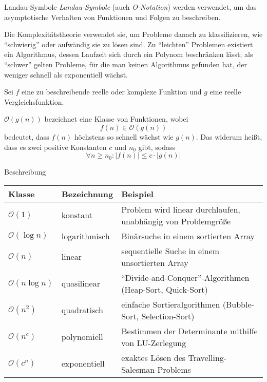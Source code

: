 \begin{defi}{Landau-Symbole}
    \emph{Landau-Symbole} (auch \emph{O-Notation}) werden verwendet, um das asymptotische Verhalten von Funktionen und Folgen zu beschreiben.

    Die Komplexitätstheorie verwendet sie, um Probleme danach zu klassifizieren, wie \enquote{schwierig} oder aufwändig sie zu lösen sind.
    Zu \enquote{leichten} Problemen existiert ein Algorithmus, dessen Laufzeit sich durch ein Polynom beschränken lässt;
    als \enquote{schwer} gelten Probleme, für die man keinen Algorithmus gefunden hat, der weniger schnell als exponentiell wächst.

    Sei $f$ eine zu beschreibende reelle oder komplexe Funktion und $g$ eine reelle Vergleichsfunktion.

    $\mathcal{O}(g(n))$ bezeichnet eine Klasse von Funktionen, wobei
    \[ f(n) \in \mathcal{O}(g(n)) \]
    bedeutet, dass $f(n)$ höchstens so schnell wächst wie $g(n)$.
    Das widerum heißt, dass es zwei positive Konstanten $c$ und $n_0$ gibt, sodass
    \[ \forall n \geq n_0 : | f(n) | \leq c \cdot | g(n) | \]
\end{defi}

\begin{example}[Komplexitätsklassen]{Beschreibung}
    \begin{tabularx}{\linewidth}{@{}llX@{}}
        \toprule
        Klasse                  & Bezeichnung   & Beispiel                                                         \\
        \midrule
        $\mathcal{O}(1)$        & konstant      & Problem wird linear durchlaufen, unabhängig von Problemgröße     \\
        $\mathcal{O}(\log n)$   & logarithmisch & Binärsuche in einem sortierten Array                             \\
        $\mathcal{O}(n)$        & linear        & sequentielle Suche in einem unsortierten Array                   \\
        $\mathcal{O}(n \log n)$ & quasilinear   & \enquote{Divide-and-Conquer}-Algorithmen (Heap-Sort, Quick-Sort) \\
        $\mathcal{O}(n^2)$      & quadratisch   & einfache Sortieralgorithmen (Bubble-Sort, Selection-Sort)        \\
        $\mathcal{O}(n^c)$      & polynomiell   & Bestimmen der Determinante mithilfe von LU-Zerlegung             \\
        $\mathcal{O}(c^n)$      & exponentiell  & exaktes Lösen des Travelling-Salesman-Problems                   \\
        \bottomrule
    \end{tabularx}
\end{example}

